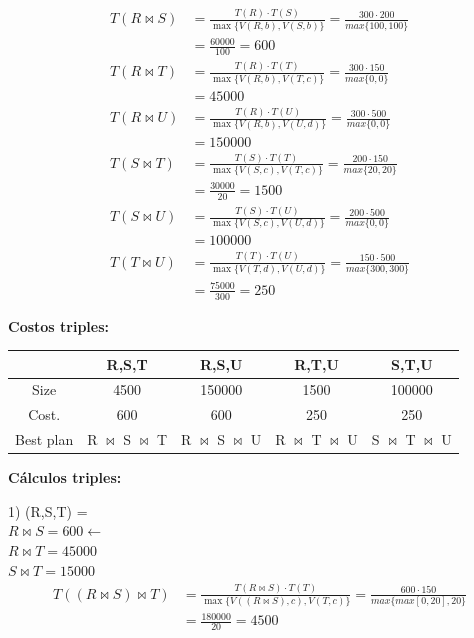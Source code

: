 \documentclass{templateNote}
\begin{document}
\begin{enumerate}
    \begin{align*}
        T(R \Join S) &= \frac{T(R)\cdot T(S)}{\max\{V(R,b),V(S,b)\}} = \frac{300\cdot200}{max\{100,100\}} \\ 
        &= \frac{60000}{100} = 600 \\
        T(R \Join T) &= \frac{T(R)\cdot T(T)}{\max\{V(R,b),V(T,c)\}} = \frac{300\cdot150}{max\{0,0\}} \\
        &= 45000 \\
        T(R \Join U) &= \frac{T(R)\cdot T(U)}{\max\{V(R,b),V(U,d)\}} = \frac{300\cdot500}{max\{0,0\}} \\
        &= 150000 \\
        T(S \Join T) &= \frac{T(S)\cdot T(T)}{\max\{V(S,c),V(T,c)\}} = \frac{200\cdot150}{max\{20,20\}} \\
        &= \frac{30000}{20} = 1500 \\
        T(S \Join U) &= \frac{T(S)\cdot T(U)}{\max\{V(S,c),V(U,d)\}} = \frac{200\cdot500}{max\{0,0\}} \\
        &= 100000\\
        T(T \Join U) &= \frac{T(T)\cdot T(U)}{\max\{V(T,d),V(U,d)\}} = \frac{150\cdot500}{max\{300,300\}} \\
        &= \frac{75000}{300} = 250
    \end{align*}

    \textbf{Costos triples:}
    \begin{center}
        \begin{tabular}{|c|c|c|c|c|}
            \hline
            & R,S,T & R,S,U & R,T,U & S,T,U\\
            \hline
            Size & 4500 & 150000 & 1500 & 100000 \\
            \hline
            Cost. & 600 & 600 & 250 & 250 \\
            \hline
            Best plan & R $\bowtie$ S $\bowtie$ T & R $\bowtie$ S $\bowtie$ U & R $\bowtie$ T $\bowtie$ U & S $\bowtie$ T $\bowtie$ U \\
            \hline
        \end{tabular}
    \end{center}

    \textbf{Cálculos triples:}

    1) (R,S,T) = \\
                \hspace*{0.25cm}$R \Join S = 600  \leftarrow$ \\
                \hspace*{0.25cm}$R \Join T = 45000$ \\
                \hspace*{0.25cm}$S \Join T = 15000$ 
                \begin{align*}
                    T((R \Join S) \Join T) &= \frac{T(R \Join S)\cdot T(T)}{\max\{V((R \Join S),c),V(T,c)\}} = \frac{600\cdot150}{max\{max[0,20],20\}} \\ 
                    &= \frac{180000}{20} = 4500
                \end{align*}
    

\end{enumerate}
\end{document}
